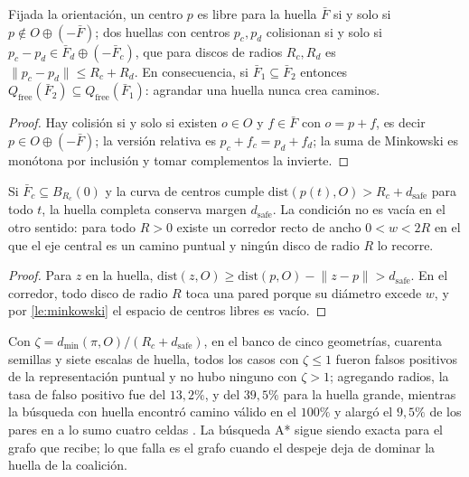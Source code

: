 \begin{lema}
\label{le:minkowski}
Fijada la orientación, un centro $p$ es libre para la huella $\bar F$ si y
solo si $p\notin O\oplus(-\bar F)$; dos huellas con centros $p_c,p_d$
colisionan si y solo si $p_c-p_d\in\bar F_d\oplus(-\bar F_c)$, que para
discos de radios $R_c,R_d$ es $\lVert p_c-p_d\rVert\le R_c+R_d$. En
consecuencia, si $\bar F_1\subseteq\bar F_2$ entonces
$Q_{\mathrm{free}}(\bar F_2)\subseteq Q_{\mathrm{free}}(\bar F_1)$: agrandar
una huella nunca crea caminos.
\end{lema}

\begin{proof}
Hay colisión si y solo si existen $o\in O$ y $f\in\bar F$ con $o=p+f$, es
decir $p\in O\oplus(-\bar F)$; la versión relativa es $p_c+f_c=p_d+f_d$; la
suma de Minkowski es monótona por inclusión y tomar complementos la invierte.
\end{proof}

\begin{proposicion}
\label{pr:certificado-despeje}
Si $\bar F_c\subseteq B_{R_c}(0)$ y la curva de centros cumple
$\mathrm{dist}(p(t),O)>R_c+d_{\mathrm{safe}}$ para todo $t$, la huella
completa conserva margen $d_{\mathrm{safe}}$. La condición no es vacía en el
otro sentido: para todo $R>0$ existe un corredor recto de ancho $0<w<2R$ en
el que el eje central es un camino puntual y ningún disco de radio $R$ lo
recorre.
\end{proposicion}

\begin{proof}
Para $z$ en la huella, $\mathrm{dist}(z,O)\ge\mathrm{dist}(p,O)-\lVert z-p\rVert>d_{\mathrm{safe}}$.
En el corredor, todo disco de radio $R$ toca una pared porque su diámetro
excede $w$, y por \cref{le:minkowski} el espacio de centros libres es vacío.
\end{proof}

\begin{observacion}
\label{obs:despeje-normalizado}
Con $\zeta=d_{\min}(\pi,O)/(R_c+d_{\mathrm{safe}})$, en el banco de cinco
geometrías, cuarenta semillas y siete escalas de huella, todos los casos con
$\zeta\le1$ fueron falsos positivos de la representación puntual y no hubo
ninguno con $\zeta>1$; agregando radios, la tasa de falso positivo fue del
$13{,}2\%$, y del $39{,}5\%$ para la huella grande, mientras la búsqueda con
huella encontró camino válido en el $100\%$ y alargó el $9{,}5\%$ de los
pares en a lo sumo cuatro celdas \cite{mayorga2026compendio}. La búsqueda A*
sigue siendo exacta para el grafo que recibe; lo que falla es el grafo cuando
el despeje deja de dominar la huella de la coalición.
\end{observacion}

